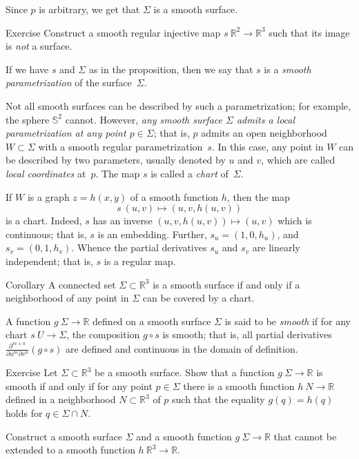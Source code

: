 Since $p$ is arbitrary, we get that $\Sigma$ is a smooth surface.
\qeds

\begin{thm}{Exercise}\label{ex:9-surf}
Construct a smooth regular injective map $s\:\mathbb{R}^2\to\mathbb{R}^3$ such that its image is \textit{not} a surface.
\end{thm}

If we have $s$ and $\Sigma$ as in the proposition, then we say that $s$ is a \emph{smooth parametrization} of the surface~$\Sigma$. 

Not all smooth surfaces can be described by such a parametrization;
for example, the sphere $\mathbb{S}^2$ cannot.
However, \textit{any smooth surface $\Sigma$ admits a local parametrization at any point $p\in\Sigma$}; that is,  $p$ admits an open neighborhood $W\subset \Sigma$ with a smooth regular parametrization~$s$.
In this case, any point in $W$ can be described by two parameters, usually denoted by $u$ and $v$, 
which are called \emph{local coordinates} at~$p$.
The map $s$ is called a \emph{chart} of~$\Sigma$.

If $W$ is a graph $z=h(x,y)$ of a smooth function $h$, then the map 
\[s\:(u,v)\mapsto (u,v,h(u,v))\] is a chart.
Indeed, $s$ has an inverse $(u,v,h(u,v))\mapsto (u,v)$ which is continuous;
that is, $s$ is an embedding.
Further,
$s_u=(1,0,h_u)$, and $s_v=(0,1,h_v)$. 
Whence the partial derivatives $s_u$ and $s_v$ are linearly independent;
that is, $s$ is a regular map.

\begin{thm}{Corollary}\label{cor:reg-parmeterization}
A connected set $\Sigma\subset \mathbb{R}^3$ is a smooth surface if and only if a neighborhood of any point in $\Sigma$ can be covered by a chart.
\end{thm}

A function $g\: \Sigma \to \mathbb{R}$ defined on a smooth surface $\Sigma$ is said to be \emph{smooth} if for any chart $s \: U\to \Sigma$,
the composition $g\circ s$ is smooth; that is, all partial derivatives $\frac{\partial^{m+n}}{\partial u^m\partial v^n}(g\circ s)$ are defined and continuous in the domain of definition.

\begin{thm}{Exercise}\label{ex:smooth-fun(surf)}
Let $\Sigma\subset \mathbb{R}^3$ be a smooth surface.
Show that a function $g\:\Sigma\to\mathbb{R}$ is smooth if and only if for any point $p\in \Sigma$ there is a smooth function $h\:N\to\mathbb{R}$ defined in a neighborhood $N\subset \mathbb{R}^3$ of $p$ such that the equality $g(q)=h(q)$ holds for $q\in \Sigma\cap N$.

Construct a smooth surface $\Sigma$ and a smooth function $g\:\Sigma\to\mathbb{R}$ that cannot be extended to a smooth function $h\:\mathbb{R}^3\to\mathbb{R}$.
\end{thm}


